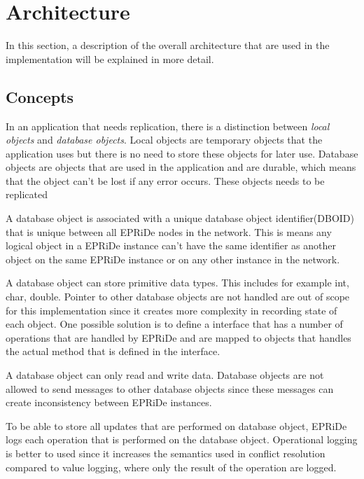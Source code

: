 
\section{Architecture} %
\label{sec:arch}

In this section, a description of the overall architecture that are used in the implementation will be explained in more detail.  


\subsection{Concepts} %
\label{sub:consepts}

In an application that needs replication, there is a distinction between \emph{local objects} and \emph{database objects}. Local objects are temporary objects that the application uses but there is no need to store these objects for later use. Database objects are objects that are used in the application and are durable, which means that the object can't be lost if any error occurs. These objects needs to be replicated 

A database object is associated with a unique database object identifier(DBOID) that is unique between all EPRiDe nodes in the network. This is means any logical object in a EPRiDe instance can't have the same identifier as another object on the same EPRiDe instance or on any other instance in the network.    

A database object can store primitive data types. This includes for example int, char, double. Pointer to other database objects are not handled are out of scope for this implementation since it creates more complexity in recording state of each object. One possible solution is to define a interface that has a number of operations that are handled by EPRiDe and are mapped to objects that handles the actual method that is defined in the interface.    

A database object can only read and write data. Database objects are not allowed to send messages to other database objects since these messages can create inconsistency between EPRiDe instances.

To be able to store all updates that are performed on database object, EPRiDe logs each operation that is performed on the database object. Operational logging is better to used since it increases the semantics used in conflict resolution compared to value logging, where only the result of the operation are logged. 

